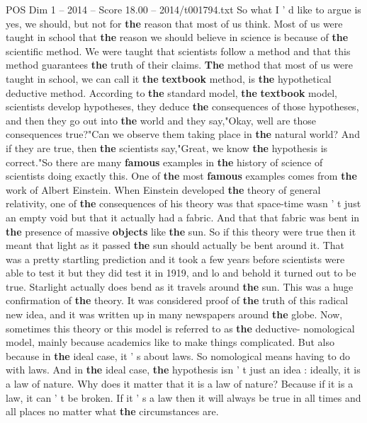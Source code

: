 \begin{textsample}{POS Dim 1 – 2014 – Score 18.00 – 2014/t001794.txt}
So what I ' d like to argue is yes, we should, but not for \textbf{the} reason that most of us think.
Most of us were taught in school that \textbf{the} reason we should believe in science is because of \textbf{the} scientific method.
We were taught that scientists follow a method and that this method guarantees \textbf{the} truth of their claims. \textbf{The} method that most of us were taught in school, we can call it \textbf{the} \textbf{textbook} method, is \textbf{the} hypothetical deductive method.
According to \textbf{the} standard model, \textbf{the} \textbf{textbook} model, scientists develop hypotheses, they deduce \textbf{the} consequences of those hypotheses, and then they go out into \textbf{the} world and they say,"Okay, well are those consequences true?"Can we observe them taking place in \textbf{the} natural world?
And if they are true, then \textbf{the} scientists say,"Great, we know \textbf{the} hypothesis is correct."So there are many \textbf{famous} examples in \textbf{the} history of science of scientists doing exactly this.
One of \textbf{the} most \textbf{famous} examples comes from \textbf{the} work of Albert Einstein.
When Einstein developed \textbf{the} theory of general relativity, one of \textbf{the} consequences of his theory was that space-time wasn ' t just an empty void but that it actually had a fabric.
And that that fabric was bent in \textbf{the} presence of massive \textbf{objects} like \textbf{the} sun.
So if this theory were true then it meant that light as it passed \textbf{the} sun should actually be bent around it.
That was a pretty startling prediction and it took a few years before scientists were able to test it but they did test it in 1919, and lo and behold it turned out to be true.
Starlight actually does bend as it travels around \textbf{the} sun.
This was a huge confirmation of \textbf{the} theory.
It was considered proof of \textbf{the} truth of this radical new idea, and it was written up in many newspapers around \textbf{the} globe.
Now, sometimes this theory or this model is referred to as \textbf{the} deductive- nomological model, mainly because academics like to make things complicated.
But also because in \textbf{the} ideal case, it ' s about laws.
So nomological means having to do with laws.
And in \textbf{the} ideal case, \textbf{the} hypothesis isn ' t just an idea : ideally, it is a law of nature.
Why does it matter that it is a law of nature?
Because if it is a law, it can ' t be broken.
If it ' s a law then it will always be true in all times and all places no matter what \textbf{the} circumstances are.

\end{textsample}
